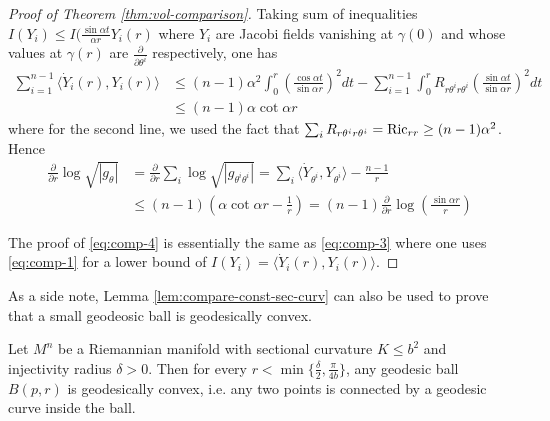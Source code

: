 \begin{proof}[Proof of Theorem \ref{thm:vol-comparison}]
Taking sum of inequalities \(I(Y_{i}) \leq I(\frac{\sin \alpha t}{\alpha
r}Y_i(r)\) where \(Y_i\) are Jacobi fields vanishing at \(\gamma(0)\) and
whose values at \(\gamma(r)\) are \(\frac{\partial}{\partial \theta^i}\) respectively,
one has
\begin{equation*}
\begin{split}
\sum_{i=1}^{n-1} \langle \dot Y_i(r), Y_i(r) \rangle &\leq	(n-1)\alpha^2 \int_0^r\left( \frac{\cos \alpha t}{\sin \alpha r}\right)^2 dt -\sum_{i=1}^{n-1}\int_0^r R_{r\theta^ir\theta^i}\left(\frac{\sin \alpha t}{\sin \alpha r}\right)^2 dt\\
		 	 &\leq (n-1)\alpha\cot \alpha r
\end{split}   
\end{equation*}
where for the second line, we used the fact that \(\sum_i R_{r\theta^i r\theta^i}={\rm
Ric}_{rr}\geq (n-1)\alpha^2\). Hence 
\begin{equation*}
\begin{split}
\frac{\partial}{\partial r}\log\sqrt{|g_\theta|}&= \frac{\partial}{\partial
r}\sum_i\log\sqrt{|g_{\theta^i\theta^i}|} = \sum_i \langle \dot
Y_{\theta^i},Y_{\theta^i}\rangle - \frac{n-1}{r}\\
 				 &\leq (n-1)\left(\alpha\cot \alpha r - \frac{1}{r}\right) = (n-1) \frac{\partial}{\partial r}\log \left( \frac{\sin \alpha r}{r}\right)
\end{split}   
\end{equation*}

The proof of \eqref{eq:comp-4} is essentially the same as \eqref{eq:comp-3} where one uses
\eqref{eq:comp-1} for a lower bound of \(I(Y_i) = \langle \dot Y_i(r), Y_i(r) \rangle\).
\end{proof}


As a side note, Lemma \ref{lem:compare-const-sec-curv} can also be used to prove that a small geodeosic ball
is geodesically convex.

\begin{proposition}
\label{prop:geodesic-convex}
Let \(M^n\) be a Riemannian manifold with sectional curvature \(K\leq b^2\) and
injectivity radius \(\delta >0\). Then for every \(r<\min\{\frac{\delta}{2},
\frac{\pi}{4b}\}\), any geodesic ball \(B(p,r)\) is geodesically convex, i.e. any two
points is connected by a geodesic curve inside the ball.
\end{proposition}


